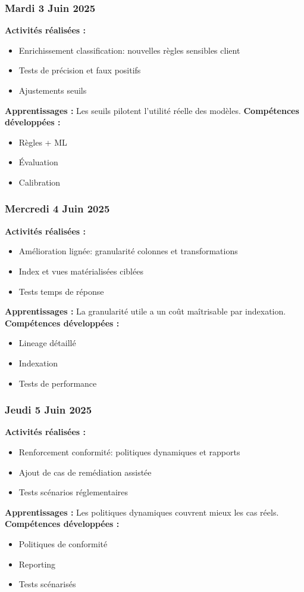 \documentclass[12pt,a4paper]{article}
\begin{document}
\subsubsection{Mardi 3 Juin 2025}
\textbf{Activités réalisées :}
\begin{itemize}
    \item Enrichissement classification: nouvelles règles sensibles client
    \item Tests de précision et faux positifs
    \item Ajustements seuils
\end{itemize}
\textbf{Apprentissages :} Les seuils pilotent l'utilité réelle des modèles.
\textbf{Compétences développées :}
\begin{itemize}
    \item Règles + ML
    \item Évaluation
    \item Calibration
\end{itemize}

\subsubsection{Mercredi 4 Juin 2025}
\textbf{Activités réalisées :}
\begin{itemize}
    \item Amélioration lignée: granularité colonnes et transformations
    \item Index et vues matérialisées ciblées
    \item Tests temps de réponse
\end{itemize}
\textbf{Apprentissages :} La granularité utile a un coût maîtrisable par indexation.
\textbf{Compétences développées :}
\begin{itemize}
    \item Lineage détaillé
    \item Indexation
    \item Tests de performance
\end{itemize}

\subsubsection{Jeudi 5 Juin 2025}
\textbf{Activités réalisées :}
\begin{itemize}
    \item Renforcement conformité: politiques dynamiques et rapports
    \item Ajout de cas de remédiation assistée
    \item Tests scénarios réglementaires
\end{itemize}
\textbf{Apprentissages :} Les politiques dynamiques couvrent mieux les cas réels.
\textbf{Compétences développées :}
\begin{itemize}
    \item Politiques de conformité
    \item Reporting
    \item Tests scénarisés
\end{itemize}
\end{document}
